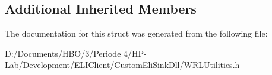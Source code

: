 \subsection*{Additional Inherited Members}


The documentation for this struct was generated from the following file\+:\begin{DoxyCompactItemize}
\item 
D\+:/\+Documents/\+H\+B\+O/3/\+Periode 4/\+H\+P-\/\+Lab/\+Development/\+E\+L\+I\+Client/\+Custom\+Eli\+Sink\+Dll/W\+R\+L\+Utilities.\+h\end{DoxyCompactItemize}
